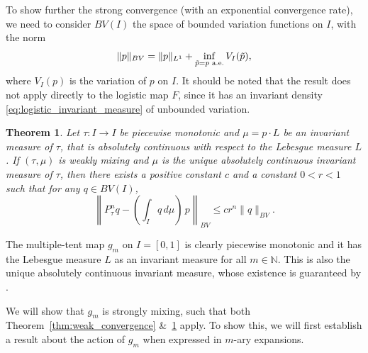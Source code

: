 \documentclass[a4paper]{article}
\newtheorem{theorem}{Theorem}%
\theoremstyle{definition}
\numberwithin{equation}{section}
\numberwithin{theorem}{section}
\begin{document}
{To show further the strong convergence (with an exponential convergence rate), we need to consider $BV(I)$ the space of bounded variation functions on $I$, with the norm
\begin{equation*}
    \lVert p \rVert_{BV} = \lVert p \rVert_{ L^1} + \inf_{\Tilde{p}=p\text{ a.e.}}V_I(\Tilde{p}),
\end{equation*}
where $V_I(p)$ is the variation of $p$ on $I$. It should be noted that the result does not apply directly to the logistic map $F$, since it has an invariant density \eqref{eq:logistic_invariant_measure} of unbounded variation.

\begin{theorem} \cite[Theorem~8.3.1]{boyarsky1997laws} \label{thm:strong_convergence}
    Let $\tau:I\rightarrow I$ be piecewise monotonic and $\mu = p\cdot L$ be an invariant measure of $\tau$, that is absolutely continuous with respect to the Lebesgue measure $L$. If $(\tau,\mu)$ is weakly mixing and $\mu$ is the unique absolutely continuous invariant measure of $\tau$, then there exists a positive constant $c$ and a constant $0<r<1$ such that for any $q\in BV(I)$,
    \begin{equation}
        \left\lVert P_{\tau}^n q-\left(\int_I q\,d\mu\right)\,p\right\rVert_{BV} \leq cr^n\lVert q \rVert_{BV}.
    \end{equation}
\end{theorem}

The multiple-tent map $g_m$ on $I=[0,1]$ is clearly piecewise monotonic and it has the Lebesgue measure $L$ as an invariant measure for all $m\in\mathbb{N}$. This is also the unique absolutely continuous invariant measure, whose existence is guaranteed by \cite[Theorem~4]{lasota1982invariant}. 

We will show that $g_m$ is strongly mixing, such that both Theorem~\ref{thm:weak_convergence} \&~\ref{thm:strong_convergence} apply. To show this, we will first establish a result about the action of $g_m$ when expressed in $m$-ary expansions.

}
\end{document}
